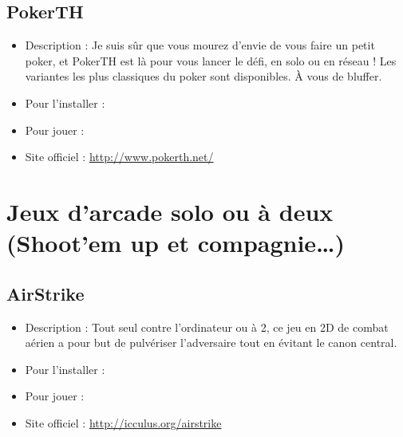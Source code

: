 \subsection{PokerTH}
\begin{itemize}
\begingroup
{}
\item Description : Je suis sûr que vous mourez d'envie de vous faire un petit poker, et PokerTH est là pour vous lancer le défi, en solo ou en réseau ! Les variantes les plus classiques du poker sont disponibles. À vous de bluffer.{\par}
\endgroup
\item Pour l'installer : 
\item Pour jouer : 
\item Site officiel : \url{http://www.pokerth.net/}{\par}
\end{itemize}
\section{Jeux d'arcade solo ou à deux (Shoot'em up et compagnie\ldots{})}
\subsection{AirStrike}
\begin{itemize}
\begingroup
{}
\item Description : Tout seul contre l'ordinateur ou à 2, ce  jeu en 2D de combat aérien a pour but de pulvériser l'adversaire tout en évitant le canon central.{\par}
\item Pour l'installer : 
\item Pour jouer : 
\item Site officiel : \url{http://icculus.org/airstrike}{\par}
\endgroup
\end{itemize}
